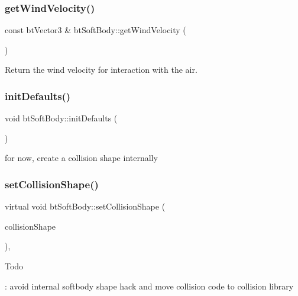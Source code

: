 \subsubsection{\texorpdfstring{get\+Wind\+Velocity()}{getWindVelocity()}}
{\footnotesize\ttfamily const bt\+Vector3 \& bt\+Soft\+Body\+::get\+Wind\+Velocity (\begin{DoxyParamCaption}{ }\end{DoxyParamCaption})}

Return the wind velocity for interaction with the air. \mbox{\label{classbtSoftBody_ae07c09d9c2937897c3690c1a3970bf61}} 
\subsubsection{\texorpdfstring{init\+Defaults()}{initDefaults()}}
{\footnotesize\ttfamily void bt\+Soft\+Body\+::init\+Defaults (\begin{DoxyParamCaption}{ }\end{DoxyParamCaption})}

for now, create a collision shape internally \mbox{\label{classbtSoftBody_aced0f5421eeb1491a3fd77bb91e2e5af}} 
\subsubsection{\texorpdfstring{set\+Collision\+Shape()}{setCollisionShape()}}
{\footnotesize\ttfamily virtual void bt\+Soft\+Body\+::set\+Collision\+Shape (\begin{DoxyParamCaption}\item[{bt\+Collision\+Shape $\ast$}]{collision\+Shape }\end{DoxyParamCaption})\hspace{0.3cm}{\ttfamily [inline]}, {\ttfamily [virtual]}}

\begin{DoxyRefDesc}{Todo}
\item[\hyperlink{todo__todo000037}{Todo}]\+: avoid internal softbody shape hack and move collision code to collision library \end{DoxyRefDesc}
\mbox{\label{classbtSoftBody_aee9ac69662731fa96ae2357522972ef9}} 
